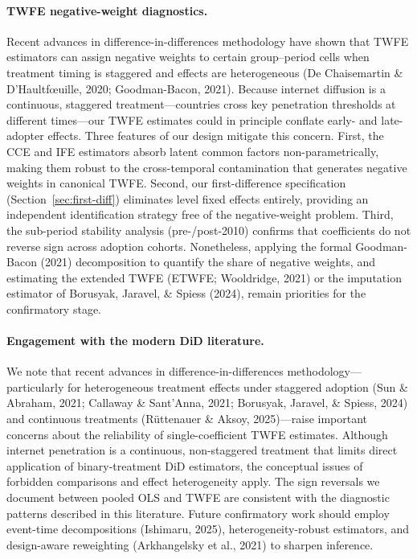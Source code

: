 \documentclass[a4paper,11pt,titlepage]{article}
\begin{document}
\paragraph{TWFE negative-weight diagnostics.}
Recent advances in difference-in-differences methodology have shown that TWFE estimators can assign negative weights to certain group--period cells when treatment timing is staggered and effects are heterogeneous (De Chaisemartin \& D'Haultf{\oe}uille, 2020; Goodman-Bacon, 2021). Because internet diffusion is a continuous, staggered treatment---countries cross key penetration thresholds at different times---our TWFE estimates could in principle conflate early- and late-adopter effects. Three features of our design mitigate this concern. First, the CCE and IFE estimators absorb latent common factors non-parametrically, making them robust to the cross-temporal contamination that generates negative weights in canonical TWFE. Second, our first-difference specification (Section~\ref{sec:first-diff}) eliminates level fixed effects entirely, providing an independent identification strategy free of the negative-weight problem. Third, the sub-period stability analysis (pre-/post-2010) confirms that coefficients do not reverse sign across adoption cohorts. Nonetheless, applying the formal Goodman-Bacon (2021) decomposition to quantify the share of negative weights, and estimating the extended TWFE (ETWFE; Wooldridge, 2021) or the imputation estimator of Borusyak, Jaravel, \& Spiess (2024), remain priorities for the confirmatory stage.

\paragraph{Engagement with the modern DiD literature.}
We note that recent advances in difference-in-differences methodology---particularly for heterogeneous treatment effects under staggered adoption (Sun \& Abraham, 2021; Callaway \& Sant'Anna, 2021; Borusyak, Jaravel, \& Spiess, 2024) and continuous treatments (R\"uttenauer \& Aksoy, 2025)---raise important concerns about the reliability of single-coefficient TWFE estimates. Although internet penetration is a continuous, non-staggered treatment that limits direct application of binary-treatment DiD estimators, the conceptual issues of forbidden comparisons and effect heterogeneity apply. The sign reversals we document between pooled OLS and TWFE are consistent with the diagnostic patterns described in this literature. Future confirmatory work should employ event-time decompositions (Ishimaru, 2025), heterogeneity-robust estimators, and design-aware reweighting (Arkhangelsky et al., 2021) to sharpen inference.
\end{document}
